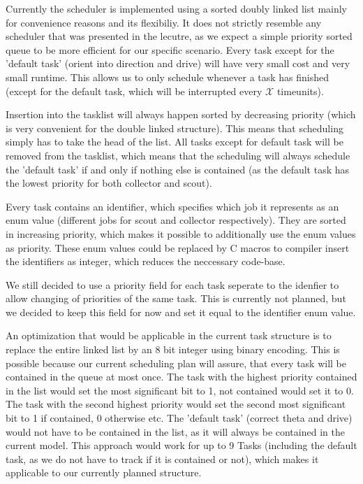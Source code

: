\documentclass[12pt]{article}
\begin{document}
Currently the scheduler is implemented using a sorted doubly linked list mainly for convenience reasons and its flexibiliy. It does not strictly resemble any scheduler that was presented in the lecutre, as we expect a simple priority sorted queue to be more efficient for our specific scenario. Every task except for the 'default task' (orient into direction and drive) will have very small cost and very small runtime. This allows us to only schedule whenever a task has finished (except for the default task, which will be interrupted every $\mathcal{X}$ timeunits).

Insertion into the tasklist will always happen sorted by decreasing priority (which is very convenient for the double linked structure). This means that scheduling simply has to take the head of the list. All tasks except for default task will be removed from the tasklist, which means that the scheduling will always schedule the 'default task' if and only if nothing else is contained (as the default task has the lowest priority for both collector and scout).

Every task contains an identifier, which specifies which job it represents as an enum value (different jobs for scout and collector respectively). They are sorted in increasing priority, which makes it possible to additionally use the enum values as priority. These enum values could be replaced by C macros to compiler insert the identifiers as integer, which reduces the neccessary code-base.

We still decided to use a priority field for each task seperate to the idenfier to allow changing of priorities of the same task. This is currently not planned, but we decided to keep this field for now and set it equal to the identifier enum value.

An optimization that would be applicable in the current task structure is to replace the entire linked list by an 8 bit integer using binary encoding. This is possible because our current scheduling plan will assure, that every task will be contained in the queue at most once. The task with the highest priority contained in the list would set the most significant bit to 1, not contained would set it to 0. The task with the second highest priority would set the second most significant bit to 1 if contained, 0 otherwise etc. The 'default task' (correct theta and drive) would not have to be contained in the list, as it will always be contained in the current model. This approach would work for up to 9 Tasks (including the default task, as we do not have to track if it is contained or not), which makes it applicable to our currently planned structure.
\end{document}
